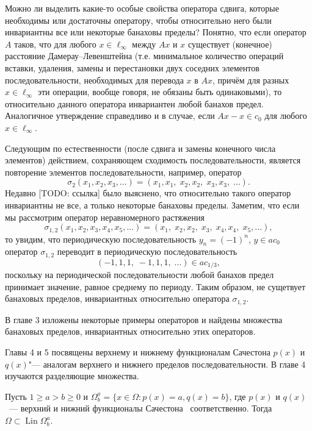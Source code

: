 Можно ли выделить какие-то особые свойства оператора сдвига,
которые необходимы или достаточны оператору, чтобы относительно него были инвариантны все или некоторые банаховы пределы?
Понятно, что если оператор $A$ таков, что для любого $x\in\ell_\infty$ между $Ax$ и $x$
существует (конечное) расстояние Дамерау--Левенштейна \cite{damerau1964technique} (т.е. минимальное количество операций вставки, удаления, замены и перестановки двух соседних элементов последовательности, необходимых для перевода $x$ в $Ax$, причём для разных $x\in\ell_\infty$ эти операции, вообще говоря, не обязаны быть одинаковыми), то относительно данного оператора инвариантен любой банахов предел. Аналогичное утверждение справедливо и в случае, если $Ax -x \in c_0$ для любого $x\in \ell_\infty$.

Следующим по естественности (после сдвига и замены конечного числа элементов) действием, сохраняющем сходимость последовательности, является повторение элементов последовательности, например, оператор
\begin{equation}
	\sigma_2(x_1,x_2,x_3,...) = (x_1,x_1, \; x_2, x_2, \; x_3, x_3, \; ...)
	.
\end{equation}
Недавно [TODO: ссылка] было выяснено, что относительно такого оператор инвариантны не все, а только некоторые банаховы пределы.
Заметим, что если мы рассмотрим оператор неравномерного растяжения
\begin{equation}
	\sigma_{1,2}(x_1,x_2,x_3,x_4,x_5,...) = (x_1, \; x_2, x_2, \;  x_3, \; x_4, x_4, \; x_5, ...)
	,
\end{equation}
то увидим, что периодическую последовательность $y_n = (-1)^n$, $y\in ac_0$ оператор $\sigma_{1,2}$
переводит в периодическую последовательность
\begin{equation}
	(-1, 1, 1, \; -1, 1, 1, \; ...) \in ac_{1/3}
	,
\end{equation}
поскольку на периодической последовательности любой банахов предел принимает значение, равное среднему по периоду.
Таким образом, не сущетвует банаховых пределов, инвариантных относительно оператора $\sigma_{1,2}$.

В главе 3 изложены некоторые примеры операторов и найдены множества банаховых пределов,
инвариантных относительно этих операторов.


Главы 4 и 5 посвящены верхнему и нижнему функционалам Сачестона $p(x)$ и $q(x)$"--- аналогам верхнего и нижнего пределов последовательности.
В главе 4 изучаются разделяющие множества.


	Пусть
	$1 \geq a > b \geq 0$ и
	$\Omega^a_b = \{x\in\Omega : p(x) = a, q(x) = b\}$,
	где $p(x)$ и $q(x)$~--- верхний и нижний функционалы Сачестона~\cite{sucheston1967banach} соответственно.
	Тогда $\Omega \subset \operatorname{Lin} \Omega^a_b$.


